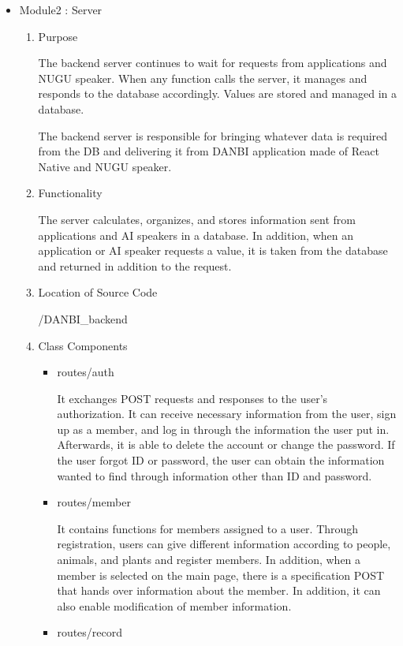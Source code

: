 \documentclass[conference]{IEEEtran}
\begin{document}
\begin{itemize}
    \item Module2 : Server
    \begin{enumerate}
    \setlength{\parindent}{2ex}
    \setlength{\parskip}{0.5em}
        \item Purpose
        
        The backend server continues to wait for requests from applications and NUGU speaker. When any function calls the server, it manages and responds to the database accordingly. Values are stored and managed in a database.

        The backend server is responsible for bringing whatever data is required from the DB and delivering it from DANBI application made of React Native and NUGU speaker.
        \item Functionality
        
        The server calculates, organizes, and stores information sent from applications and AI speakers in a database. In addition, when an application or AI speaker requests a value, it is taken from the database and returned in addition to the request.
        \item Location of Source Code
        
        /DANBI\_backend
        \item Class Components
        \begin{itemize}
            \item routes/auth
            \setlength{\parindent}{2ex}
            
            It exchanges POST requests and responses to the user's authorization. It can receive necessary information from the user, sign up as a member, and log in through the information the user put in. Afterwards, it is able to delete the account or change the password. If the user forgot ID or password, the user can obtain the information wanted to find through information other than ID and password.
            \item routes/member
            \setlength{\parindent}{2ex}
            
            It contains functions for members assigned to a user. Through registration, users can give different information according to people, animals, and plants and register members. In addition, when a member is selected on the main page, there is a specification POST that hands over information about the member. In addition, it can also enable modification of member information.
            \item routes/record
            \setlength{\parindent}{2ex}
            

\end{itemize}
\end{enumerate}
\end{itemize}
\end{document}
